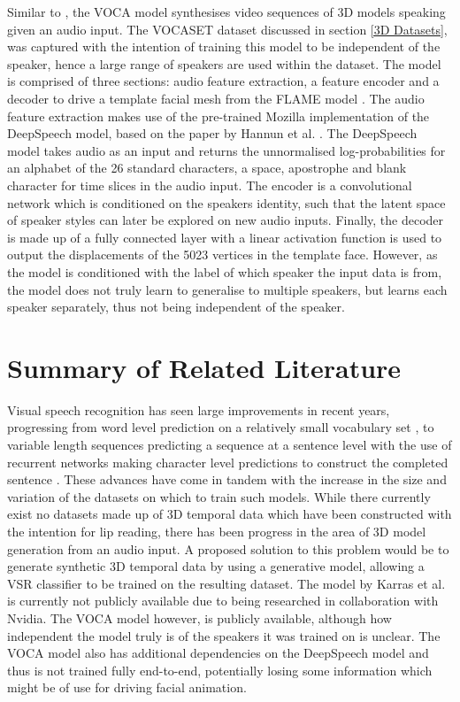 \documentclass[12pt]{report}
\begin{document}
Similar to \cite{Tzirakis2019}, the VOCA model \cite{Cudeiro2019} synthesises video sequences of 3D models speaking given an audio input.
The VOCASET dataset discussed in section \ref{3D Datasets}, was captured with the intention of training this model to be independent of the speaker, hence a large range of speakers are used within the dataset.
The model is comprised of three sections: audio feature extraction, a feature encoder and a decoder to drive a template facial mesh from the FLAME model \cite{Li2017}.
The audio feature extraction makes use of the pre-trained Mozilla implementation of the DeepSpeech model, based on the paper by Hannun et al. \cite{Hannun2014}.
The DeepSpeech model takes audio as an input and returns the unnormalised log-probabilities for an alphabet of the 26 standard characters, a space, apostrophe and blank character for time slices in the audio input.
The encoder is a convolutional network which is conditioned on the speakers identity, such that the latent space of speaker styles can later be explored on new audio inputs.
Finally, the decoder is made up of a fully connected layer with a linear activation function is used to output the displacements of the 5023 vertices in the template face.
However, as the model is conditioned with the label of which speaker the input data is from, the model does not truly learn to generalise to multiple speakers, but learns each speaker separately, thus not being independent of the speaker.

\section{Summary of Related Literature}
Visual speech recognition has seen large improvements in recent years, progressing from word level prediction on a relatively small vocabulary set \cite{Chung2016}, to variable length sequences predicting a sequence at a sentence level with the use of recurrent networks making character level predictions to construct the completed sentence \cite{Shillingford2018}.
These advances have come in tandem with the increase in the size and variation of the datasets on which to train such models.
While there currently exist no datasets made up of 3D temporal data which have been constructed with the intention for lip reading, there has been progress in the area of 3D model generation from an audio input.
A proposed solution to this problem would be to generate synthetic 3D temporal data by using a generative model, allowing a VSR classifier to be trained on the resulting dataset.
The model by Karras et al. is currently not publicly available due to being researched in collaboration with Nvidia.
The VOCA model however, is publicly available, although how independent the model truly is of the speakers it was trained on is unclear.
The VOCA model also has additional dependencies on the DeepSpeech model and thus is not trained fully end-to-end, potentially losing some information which might be of use for driving facial animation.



\end{document}
